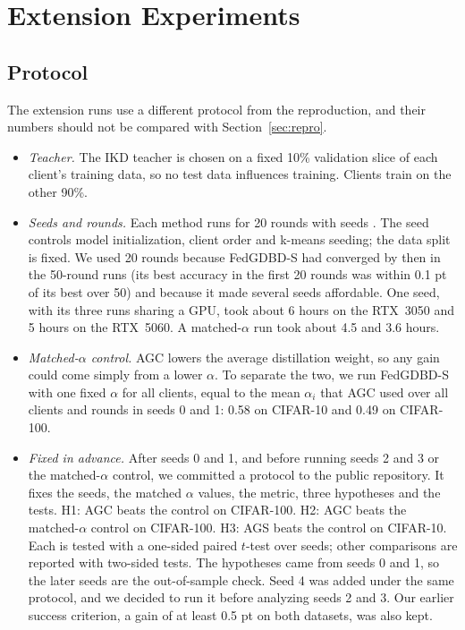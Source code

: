 \documentclass[conference]{IEEEtran}
\begin{document}
\section{Extension Experiments}
\label{sec:ext}

\subsection{Protocol}
\label{sec:protocol}
The extension runs use a different protocol from the reproduction, and their numbers should not be compared with Section~\ref{sec:repro}.
\begin{itemize}
\item \textit{Teacher.} The IKD teacher is chosen on a fixed 10\% validation slice of each client's training data, so no test data influences training. Clients train on the other 90\%.
\item \textit{Seeds and rounds.} Each method runs for 20 rounds with seeds \SeedList{}. The seed controls model initialization, client order and k-means seeding; the data split is fixed. We used 20 rounds because FedGDBD-S had converged by then in the 50-round runs (its best accuracy in the first 20 rounds was within 0.1 pt of its best over 50) and because it made several seeds affordable. One seed, with its three runs sharing a GPU, took about 6 hours on the RTX~3050 and 5 hours on the RTX~5060. A matched-$\alpha$ run took about 4.5 and 3.6 hours.
\item \textit{Matched-$\alpha$ control.} AGC lowers the average distillation weight, so any gain could come simply from a lower $\alpha$. To separate the two, we run FedGDBD-S with one fixed $\alpha$ for all clients, equal to the mean $\alpha_i$ that AGC used over all clients and rounds in seeds 0 and 1: 0.58 on CIFAR-10 and 0.49 on CIFAR-100.
\item \textit{Fixed in advance.} After seeds 0 and 1, and before running seeds 2 and 3 or the matched-$\alpha$ control, we committed a protocol to the public repository. It fixes the seeds, the matched $\alpha$ values, the metric, three hypotheses and the tests. H1: AGC beats the control on CIFAR-100. H2: AGC beats the matched-$\alpha$ control on CIFAR-100. H3: AGS beats the control on CIFAR-10. Each is tested with a one-sided paired $t$-test over seeds; other comparisons are reported with two-sided tests. The hypotheses came from seeds 0 and 1, so the later seeds are the out-of-sample check. Seed 4 was added under the same protocol, and we decided to run it before analyzing seeds 2 and 3. Our earlier success criterion, a gain of at least 0.5 pt on both datasets, was also kept.
\end{itemize}
\end{document}
